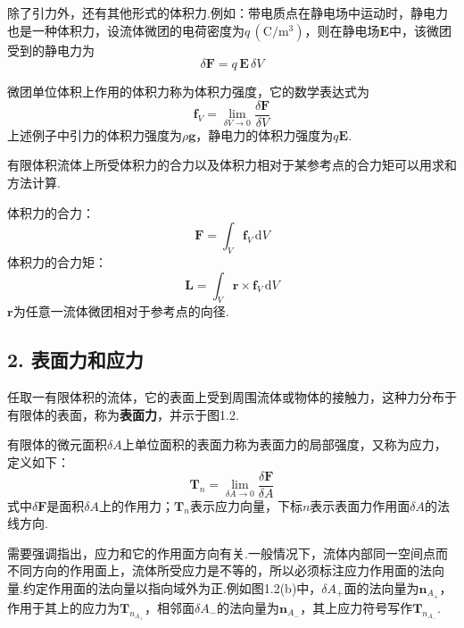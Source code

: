 除了引力外，还有其他形式的体积力.例如：带电质点在静电场中运动时，静电力也是一种体积力，设流体微团的电荷密度为$q\,(\mathrm{C/m^{3}})$，则在静电场$\boldsymbol{E}$中，该微团受到的静电力为
\begin{equation*}
\delta\boldsymbol{F}=q\,\boldsymbol{E}\,\delta V
\tag{1.5}
\end{equation*}

微团单位体积上作用的体积力称为体积力强度，它的数学表达式为
\begin{equation*}
\boldsymbol{f}_V=\lim_{\delta V\to 0}\frac{\delta\boldsymbol{F}}{\delta V}
\tag{1.6}
\end{equation*}
上述例子中引力的体积力强度为$\rho\boldsymbol{g}$，静电力的体积力强度为$q\boldsymbol{E}$.

有限体积流体上所受体积力的合力以及体积力相对于某参考点的合力矩可以用求和方法计算.

体积力的合力：
\begin{equation*}
\boldsymbol{F}=\int_V \boldsymbol{f}_V\,\mathrm{d}V
\tag{1.7}
\end{equation*}
体积力的合力矩：
\begin{equation*}
\boldsymbol{L}=\int_V \boldsymbol{r}\times\boldsymbol{f}_V\,\mathrm{d}V
\tag{1.8}
\end{equation*}
$\boldsymbol{r}$为任意一流体微团相对于参考点的向径.

\subsection*{2. 表面力和应力}

任取一有限体积的流体，它的表面上受到周围流体或物体的接触力，这种力分布于有限体的表面，称为\textbf{表面力}，并示于图1.2.

有限体的微元面积$\delta A$上单位面积的表面力称为表面力的局部强度，又称为应力，定义如下：
\begin{equation*}
\boldsymbol{T}_n=\lim_{\delta A\to 0}\frac{\delta\boldsymbol{F}}{\delta A}
\tag{1.9}
\end{equation*}
式中$\delta\boldsymbol{F}$是面积$\delta A$上的作用力；$\boldsymbol{T}_n$表示应力向量，下标$n$表示表面力作用面$\delta A$的法线方向.

需要强调指出，应力和它的作用面方向有关.一般情况下，流体内部同一空间点而不同方向的作用面上，流体所受应力是不等的，所以必须标注应力作用面的法向量.约定作用面的法向量以指向域外为正.例如图1.2(b)中，$\delta A_+$面的法向量为$\boldsymbol{n}_{A_+}$，作用于其上的应力为$\boldsymbol{T}_{n_{A_+}}$，相邻面$\delta A_-$的法向量为$\boldsymbol{n}_{A_-}$，其上应力符号写作$\boldsymbol{T}_{n_{A_-}}$.

